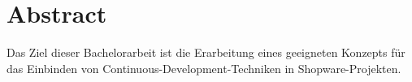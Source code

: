 
\section*{Abstract} \label{sec:00-abstract}


Das Ziel dieser Bachelorarbeit ist die Erarbeitung eines geeigneten Konzepts für das Einbinden von
Continuous-Development-Techniken in Shopware-Projekten.

\clearpage
